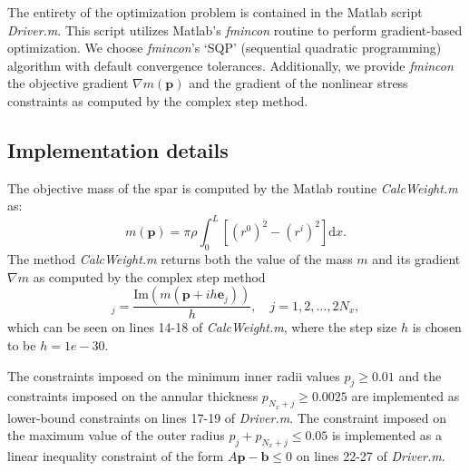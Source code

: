 \documentclass[10pt]{article}
\newcommand{\bs}[1] {\boldsymbol{#1}}
\begin{document}
The entirety of the optimization problem is
contained in the Matlab script \emph{Driver.m}. This script utilizes
Matlab's \emph{fmincon} routine to perform gradient-based optimization.
We choose \emph{fmincon}'s `SQP' (sequential quadratic programming)
algorithm with default convergence tolerances. Additionally,
we provide \emph{fmincon} the  objective gradient $\nabla m (\bs{p})$
and the gradient of the nonlinear stress constraints as computed
by the complex step method.

\subsection{Implementation details}

The objective mass of the spar is computed by the Matlab routine
\emph{CalcWeight.m} as:
%
\begin{equation}
m(\bs{p}) = \pi \rho \int_0^L \left[ (r^0)^2 - (r^i)^2 \right] \text{d} x.
\end{equation}
%
The method \emph{CalcWeight.m} returns both the value of the
mass $m$ and its gradient $\nabla m$ as computed by the complex
step method
%
\begin{equation}
[ \nabla m(\bs{p}) ]_j = \frac{\text{Im}(m( \bs{p} + i h \bs{e}_j))}{h},
\quad j=1,2,\dots,2N_x,
\end{equation}
which can be seen on lines 14-18 of \emph{CalcWeight.m}, where
the step size $h$ is chosen to be $h = 1e-30$.

The constraints imposed on the minimum inner radii values
$p_j \geq 0.01$ and the constraints imposed on the
annular thickness $p_{N_x+j} \geq 0.0025$ are implemented
as lower-bound constraints on lines 17-19 of \emph{Driver.m}.
The constraint imposed on the maximum value of the outer
radius $p_j + p_{N_x +j} \leq 0.05$ is implemented as a
linear inequality constraint of the form $A \bs{p} - \bs{b} \leq 0$
on lines 22-27 of \emph{Driver.m}.
\end{document}
